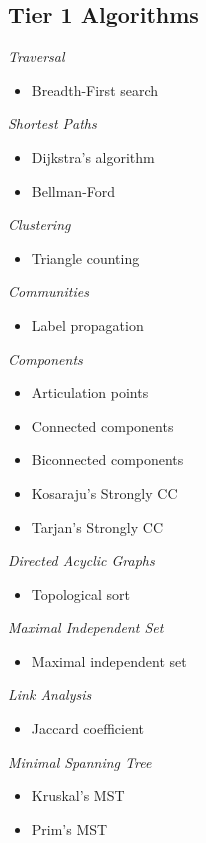 \subsection{Tier 1 Algorithms}
\begin{multicols}{3}
      \emph{Traversal}
      \begin{itemize}
            \item Breadth-First search
      \end{itemize}
      \emph{Shortest Paths}
      \begin{itemize}
            \item Dijkstra's algorithm
            \item Bellman-Ford
      \end{itemize}
      \emph{Clustering}
      \begin{itemize}
            \item Triangle counting
      \end{itemize}
      \emph{Communities}
      \begin{itemize}
            \item Label propagation
      \end{itemize}
\columnbreak
      \emph{Components}
      \begin{itemize}
            \item Articulation points
            \item Connected components
            \item Biconnected components
            \item Kosaraju's Strongly CC
            \item Tarjan's Strongly CC
      \end{itemize}
      \emph{Directed Acyclic Graphs}
      \begin{itemize}
            \item Topological sort
      \end{itemize}
\columnbreak
      \emph{Maximal Independent Set}
      \begin{itemize}
            \item Maximal independent set
      \end{itemize}
      \emph{Link Analysis}
      \begin{itemize}
            \item Jaccard coefficient
      \end{itemize}
      \emph{Minimal Spanning Tree}
      \begin{itemize}
            \item Kruskal's MST
            \item Prim's MST
      \end{itemize}

\vfill\null
\end{multicols}

